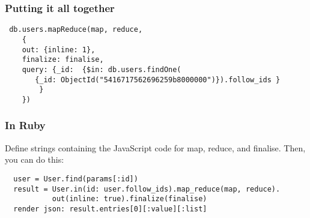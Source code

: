 \documentclass[10pt]{beamer}
\begin{document}
\begin{frame}[fragile]
  \frametitle{Putting it all together}

 \begin{verbatim}
 db.users.mapReduce(map, reduce,
    {
    out: {inline: 1},
    finalize: finalise,
    query: {_id:  {$in: db.users.findOne(
       {_id: ObjectId("5416717562696259b8000000")}).follow_ids }
        }
    })
 \end{verbatim}

\end{frame}


\begin{frame}[fragile]
  \frametitle{In Ruby}

  Define strings containing the JavaScript code for map, reduce, and finalise.
  Then, you can do this:
 \begin{verbatim}
  user = User.find(params[:id])
  result = User.in(id: user.follow_ids).map_reduce(map, reduce).
           out(inline: true).finalize(finalise)
  render json: result.entries[0][:value][:list]
 \end{verbatim}

\end{frame}
\end{document}
